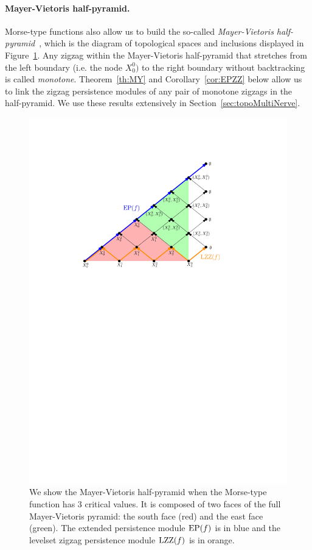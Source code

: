 \paragraph*{Mayer-Vietoris half-pyramid.} Morse-type functions also allow us to build the so-called {\em Mayer-Vietoris half-pyramid}~\cite{Carlsson09b}, 
which is the diagram of topological spaces and inclusions displayed in Figure~\ref{fig:ZZpyramid}.
Any zigzag within the Mayer-Vietoris half-pyramid that stretches from the left boundary (i.e. the node $X_0^0)$ 
to the right boundary without backtracking
is called {\em monotone}. Theorem~\ref{th:MY} and Corollary~\ref{cor:EPZZ} below allow us to link the zigzag persistence modules of 
any pair of monotone zigzags in the half-pyramid.
We use these results extensively in Section~\ref{sec:topoMultiNerve}.

\begin{figure}\centering
\includegraphics[width=12.5cm]{figures/ZZpyramid}
\caption[Mayer-Vietoris half-pyramid]{\label{fig:ZZpyramid} We show the Mayer-Vietoris half-pyramid when the Morse-type function has
3 critical values. It is composed of two faces of the full Mayer-Vietoris pyramid: 
the south face (red) and the east face (green). The extended persistence module ${\rm EP}(f)$ is in blue and 
the levelset zigzag persistence module $\mathrm{LZZ}(f)$ is in orange.}
\end{figure}

